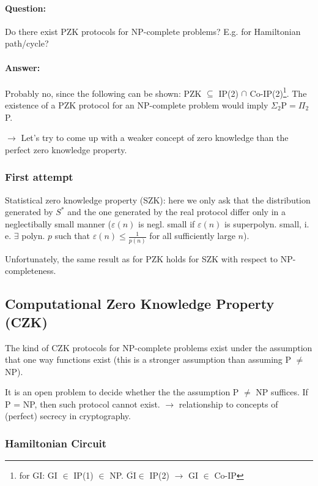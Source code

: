 \documentclass[11pt]{article}
\theoremstyle{definition}
\theoremstyle{definition}
\begin{document}
\paragraph{Question:} Do there exist PZK protocols for NP-complete problems? E.g. for Hamiltonian path/cycle?

\paragraph{Answer:} Probably no, since the following can be shown: PZK $ \subseteq $ IP(2) $ \cap $ Co-IP(2)\footnote{for GI: GI $ \in $ IP(1) $ \in $ NP. $ \overline{\text{GI}} \in $ IP(2) $ \rightarrow $ GI $ \in $ Co-IP}.
The existence of a PZK protocol for an NP-complete problem would imply $ \Sigma_2$P$ = \Pi_2 $P.

$ \rightarrow $ Let's try to come up with a weaker concept of zero knowledge than the perfect zero knowledge property.

\subsubsection{First attempt}
Statistical zero knowledge property (SZK): here we only ask that the distribution generated by $ S^\ast $ and the one generated by the real protocol differ only in a neglectibally small manner ($ \varepsilon(n) $ is negl. small if $ \varepsilon(n) $ is superpolyn. small, i. e. $ \exists $ polyn. $ p $ such that $ \varepsilon(n) \leq \frac{1}{p(n)} $ for all sufficiently large $ n $).

Unfortunately, the same result as for PZK holds for SZK with respect to NP-completeness.



\subsection{Computational Zero Knowledge Property (CZK)}



The kind of CZK protocols for NP-complete problems exist under the assumption that one way functions exist (this is a stronger assumption than assuming P $ \neq $ NP).

It is an open problem to decide whether the the assumption P $ \neq $ NP suffices. If P = NP, then such protocol cannot exist. $ \rightarrow $ relationship to concepts of (perfect) secrecy in cryptography.

\subsubsection{Hamiltonian Circuit}
\end{document}
